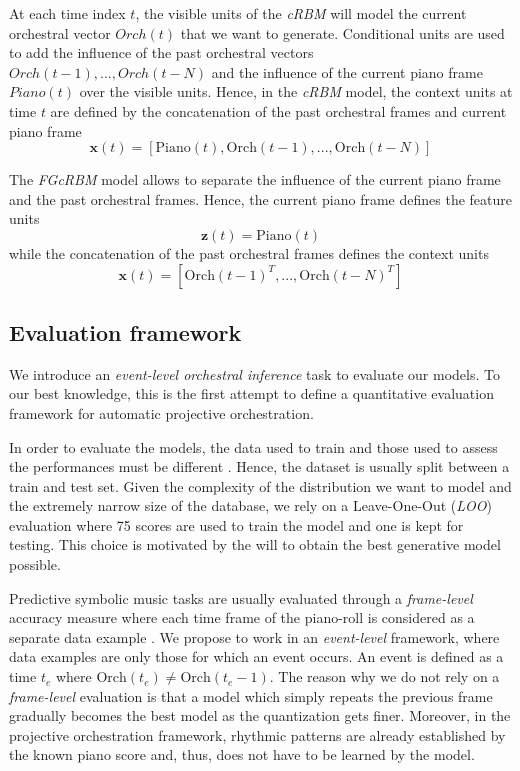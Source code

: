 \documentclass[letterpaper]{article}
\begin{document}
At each time index $t$, the visible units of the \textit{cRBM} will model the current orchestral vector $Orch(t)$ that we want to generate. Conditional units are used to add the influence of the past orchestral vectors $Orch(t-1) , ... , Orch(t-N)$ and the influence of the current piano frame $Piano(t)$ over the visible units. Hence, in the \textit{cRBM} model, the context units at time $t$ are defined by the concatenation of the past orchestral frames and current piano frame
\begin{equation}
\bm{x}(t) = \left[ \text{Piano}(t) , \text{Orch}(t-1) , ... , \text{Orch}(t-N)\right]
\end{equation}

The \textit{FGcRBM} model allows to separate the influence of the current piano frame and the past orchestral frames. Hence, the current piano frame defines the feature units
\begin{equation}
\bm{z}(t) = \text{Piano}(t)
\end{equation}
while the concatenation of the past orchestral frames defines the context units
\begin{equation}
\bm{x}(t) = \left[ \text{Orch}(t-1)^{T} , ... , \text{Orch}(t-N)^{T} \right]
\end{equation}

\subsection{Evaluation framework}
We introduce an \textit{event-level orchestral inference} task to evaluate our models. To our best knowledge, this is the first attempt to define a quantitative evaluation framework for automatic projective orchestration.

In order to evaluate the models, the data used to train and those used to assess the performances must be different \cite{bishop2006pattern}. Hence, the dataset is usually split between a train and test set.
Given the complexity of the distribution we want to model and the extremely narrow size of the database, we rely on a Leave-One-Out (\textit{LOO}) evaluation where 75 scores are used to train the model and one is kept for testing. This choice is motivated by the will to obtain the best generative model possible.

Predictive symbolic music tasks are usually evaluated through a \textit{frame-level} accuracy measure where each time frame of the piano-roll is considered as a separate data example \cite{DBLP:journals/corr/YaoCVDD15,boulanger2012modeling,lavrenko2003polyphonic}.
We propose to work in an \textit{event-level} framework, where data examples are only those for which an event occurs. An event is defined as a time $t_{e}$ where $\text{Orch}(t_{e}) \neq \text{Orch}(t_{e} - 1)$. The reason why we do not rely on a \textit{frame-level} evaluation is that a model which simply repeats the previous frame gradually becomes the best model as the quantization gets finer. Moreover, in the projective orchestration framework, rhythmic patterns are already established by the known piano score and, thus, does not have to be learned by the model.
\end{document}
